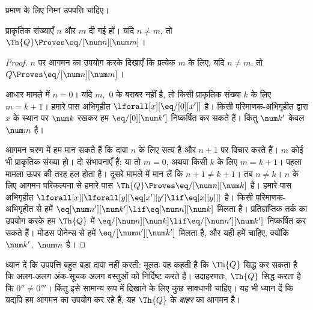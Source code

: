 \documentclass[../../../include/open-logic-section]{subfiles}
\begin{document}
प्रमाण के लिए निम्न उपपत्ति चाहिए।

\begin{lem}
 प्राकृतिक संख्याएँ $n$ और $m$ दी गई हों। यदि
$n \neq m$, तो $\Th{Q} \Proves \eq/[\num n][\num m]$।
\end{lem}

\begin{proof}
$n$ पर आगमन का उपयोग करके दिखाएँ कि प्रत्येक $m$ के लिए, यदि $n \neq m$,
तो $Q \Proves \eq/[\num n][\num m]$।

आधार मामले में $n = 0$। यदि $m$,~$0$ के बराबर नहीं है, तो किसी प्राकृतिक
संख्या $k$ के लिए $m = k + 1$। हमारे पास अभिगृहीत
$\lforall[x][\eq/[0][x']]$ है। किसी परिमाणक-अभिगृहीत द्वारा $x$ के स्थान
पर $\num k$ रखकर हम $\eq/[0][\num k']$ निष्कर्षित कर सकते हैं। किंतु
$\num k'$ केवल $\num m$ है।

आगमन चरण में हम मान सकते हैं कि दावा $n$ के लिए सत्य है और $n+1$ पर विचार
करते हैं। $m$ कोई भी प्राकृतिक संख्या हो। दो संभावनाएँ हैं: या तो $m = 0$,
अथवा किसी $k$ के लिए $m = k+1$। पहला मामला ऊपर की तरह हल होता है। दूसरे
मामले में मान लें कि $n+1 \neq k+1$। तब $n \neq k$। $n$ के लिए आगमन
परिकल्पना से हमारे पास $\Th{Q} \Proves \eq/[\num n][\num k]$ है। हमारे
पास अभिगृहीत
$\lforall[x][\lforall[y][\eq[x'][y'] \lif \eq[x][y]]]$ है। किसी
परिमाणक-अभिगृहीत से हमें
$\eq[\num n'][\num k'] \lif \eq[\num n][\num k]$ मिलता है। प्रतिज्ञप्तिक
तर्क का उपयोग करके हम $\Th{Q}$ में
$\eq/[\num n][\num k] \lif \eq/[\num n'][\num k']$ निष्कर्षित कर सकते
हैं। मोडस पोनेन्स से हमें $\eq/[\num n'][\num k']$ मिलता है, और यही हमें
चाहिए, क्योंकि $\num k'$,~$\num m$ है।
\end{proof}

\begin{explain}
ध्यान दें कि उपपत्ति बहुत बड़ा दावा नहीं करती: मूलतः वह कहती है कि
$\Th{Q}$ सिद्ध कर सकता है कि अलग-अलग अंक-सूचक अलग वस्तुओं को निर्दिष्ट
करते हैं। उदाहरणतः, $\Th{Q}$ सिद्ध करता है कि $0'' \neq 0'''$। किंतु इसे
सामान्य रूप में दिखाने के लिए कुछ सावधानी चाहिए। यह भी ध्यान दें कि यद्यपि
हम आगमन का उपयोग कर रहे हैं, यह $\Th{Q}$ के \emph{बाहर} का आगमन है।
\end{explain}
\end{document}
